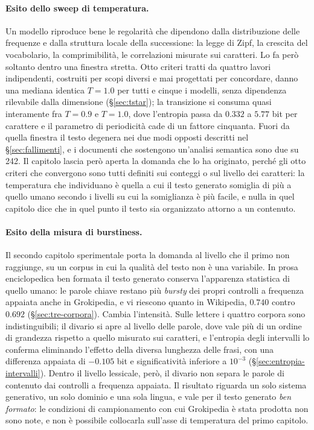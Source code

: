 \paragraph{Esito dello sweep di temperatura.}
Un modello riproduce bene le regolarità che dipendono dalla distribuzione delle
frequenze e dalla struttura locale della successione: la legge di Zipf, la
crescita del vocabolario, la comprimibilità, le correlazioni misurate sui
caratteri. Lo fa però soltanto dentro una finestra stretta. Otto criteri tratti
da quattro lavori indipendenti, costruiti per scopi diversi e mai progettati per
concordare, danno una mediana identica $T = 1.0$ per tutti e cinque i modelli,
senza dipendenza rilevabile dalla dimensione (§\ref{sec:tstar}); la transizione
si consuma quasi interamente fra $T = 0.9$ e $T = 1.0$, dove l'entropia passa da
$0.332$ a $5.77$ bit per carattere e il parametro di periodicità cade di un
fattore cinquanta. Fuori da quella finestra il testo degenera nei due modi
opposti descritti nel §\ref{sec:fallimenti}, e i documenti che sostengono
un'analisi semantica sono due su \num{242}. Il capitolo lascia però aperta la
domanda che lo ha originato, perché gli otto criteri che convergono sono tutti
definiti sui conteggi o sul livello dei caratteri: la temperatura che
individuano è quella a cui il testo generato somiglia di più a quello umano
secondo i livelli su cui la somiglianza è più facile, e nulla in quel capitolo
dice che in quel punto il testo sia organizzato attorno a un contenuto.

\paragraph{Esito della misura di burstiness.}
Il secondo capitolo sperimentale porta la domanda al livello che il primo non
raggiunge, su un corpus in cui la qualità del testo non è una variabile. In
prosa enciclopedica ben formata il testo generato conserva l'apparenza
statistica di quello umano: le parole chiave restano più \emph{bursty} dei
propri controlli a frequenza appaiata anche in Grokipedia, e vi riescono quanto
in Wikipedia, $0.740$ contro $0.692$ (§\ref{sec:tre-corpora}). Cambia
l'intensità. Sulle lettere i quattro corpora sono indistinguibili; il divario si
apre al livello delle parole, dove vale più di un ordine di grandezza rispetto a
quello misurato sui caratteri, e l'entropia degli intervalli lo conferma
eliminando l'effetto della diversa lunghezza delle frasi, con una differenza
appaiata di $-0.105$ bit e significatività inferiore a $10^{-3}$
(§\ref{sec:entropia-intervalli}). Dentro il livello lessicale, però, il divario
non separa le parole di contenuto dai controlli a frequenza appaiata. Il
risultato riguarda un solo sistema generativo, un solo dominio e una sola
lingua, e vale per il testo generato \emph{ben formato}: le condizioni di
campionamento con cui Grokipedia è stata prodotta non sono note, e non è
possibile collocarla sull'asse di temperatura del primo capitolo.


